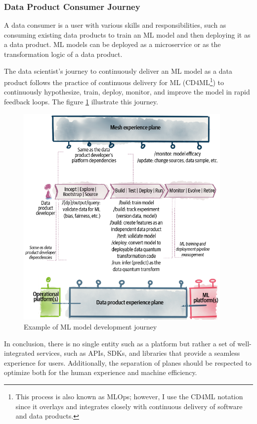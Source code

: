 \documentclass[12pt, a4paper]{book}
\begin{document}
\subsubsection*{Data Product Consumer Journey}
A data consumer is a user with various skills and responsibilities, such as consuming existing data products to train an ML model and then deploying it as a data product. ML models can be deployed as a microservice or as the transformation logic of a data product.

The data scientist's journey to continuously deliver an ML model as a data product follows the practice of continuous delivery for ML (CD4ML\footnote{This process is also known as MLOps; however, I use the CD4ML notation since it overlays and integrates closely with continuous delivery of software and data products.}) to continuously hypothesize, train, deploy, monitor, and improve the model in rapid feedback loops. The figure \ref{MLJourney} illustrate this journey.

\begin{figure}[ht]
	\vspace*{-.3cm}
	\begin{framed}
		\centering
		\includegraphics[width=10.5cm]{MLJourney.png}
		\caption{Example of ML model development journey}
		\label{MLJourney}
	\end{framed}
\end{figure}

In conclusion, there is no single entity such as a platform but rather a set of well-integrated services, such as APIs, SDKs, and libraries that provide a seamless experience for users. Additionally, the separation of planes should be respected to optimize both for the human experience and machine efficiency.
\end{document}

